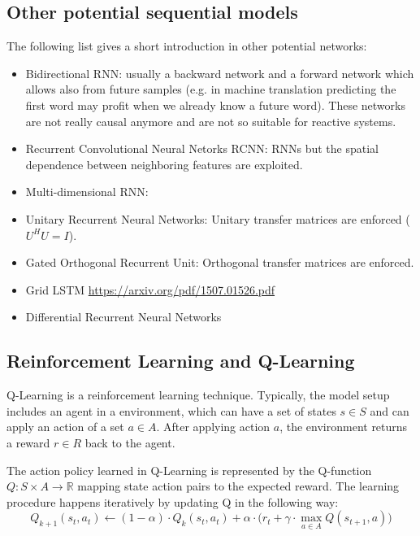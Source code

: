\subsection{Other potential sequential models}
The following list gives a short introduction in other potential networks:

\begin{itemize}
    \item Bidirectional RNN: usually a backward network and a forward network which allows also from future samples (e.g. in machine translation predicting the first word may profit when we already know a future word). These networks are not really causal anymore and are not so suitable for reactive systems.
    \item Recurrent Convolutional Neural Netorks RCNN: RNNs but the spatial dependence between neighboring features are exploited.
    \item Multi-dimensional RNN:
    \item Unitary Recurrent Neural Networks: Unitary transfer matrices are enforced ($U^HU=I$).
    \item Gated Orthogonal Recurrent Unit: Orthogonal transfer matrices are enforced.
    \item Grid LSTM \url{https://arxiv.org/pdf/1507.01526.pdf}
    \item Differential Recurrent Neural Networks
\end{itemize}
\fi
\subsection{Reinforcement Learning and Q-Learning}
Q-Learning is a reinforcement learning technique. Typically, the model setup includes an agent in a environment, which can have a set of states $s\in S$ and can apply an action of a set $a\in A$. After applying action $a$, the environment returns a reward $r\in R$ back to the agent.

The action policy learned in Q-Learning is represented by the Q-function $Q: S \times A \to \mathbb{R}$ mapping state action pairs to the expected reward. The learning procedure happens iteratively by updating Q in the following way:\\

\[Q_{k+1}(s_{t},a_{t}) \leftarrow (1-\alpha) \cdot Q_{k}(s_{t},a_{t}) + \alpha \cdot  \bigg( r_{t} + \gamma \cdot \max_{a\in A}Q(s_{t+1}, a) \bigg) \]

